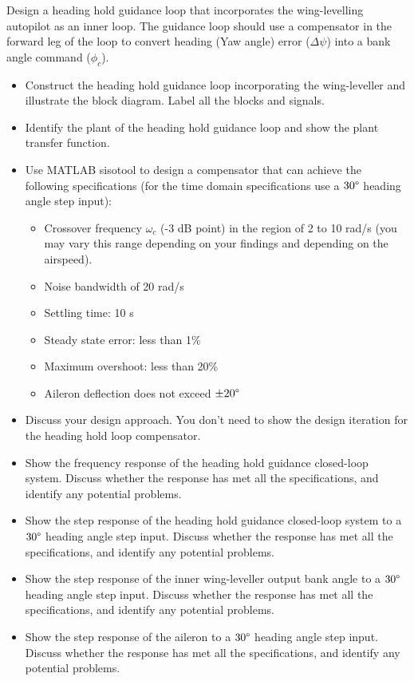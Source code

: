 Design a heading hold guidance loop that incorporates the wing-levelling autopilot as an inner loop. The guidance loop should use a compensator in the forward leg of the loop to convert heading (Yaw angle) error ($\Delta \psi$) into a bank angle command ($\phi_c$).
\begin{itemize}
\item Construct the heading hold guidance loop incorporating the wing-leveller and illustrate the block diagram. Label all the blocks and signals.
\item Identify the plant of the heading hold guidance loop and show the plant transfer function.
\item Use MATLAB sisotool to design a compensator that can achieve the following specifications (for the time domain specifications use a $30 \degree$ heading angle step input):
\begin{itemize}
\item Crossover frequency $\omega_c$ (-3 dB point) in the region of 2 to 10 rad/s (you may vary this range depending on your findings and depending on the airspeed).
\item Noise bandwidth of 20 rad/s
\item Settling time: 10 s
\item Steady state error: less than 1\%
\item Maximum overshoot: less than 20\%
\item Aileron deflection does not exceed $\pm 20 \degree$
\end{itemize}
\item Discuss your design approach. You don’t need to show the design iteration for the heading hold loop compensator.
\item Show the frequency response of the heading hold guidance closed-loop system. Discuss whether the response has met all the specifications, and identify any potential problems.
\item Show the step response of the heading hold guidance closed-loop system to a $30\degree$ heading angle step input. Discuss whether the response has met all the specifications, and identify any potential problems.
\item Show the step response of the inner wing-leveller output bank angle to a $30\degree$ heading angle step input. Discuss whether the response has met all the specifications, and identify any potential problems.
\item Show the step response of the aileron to a $30\degree$ heading angle step input. Discuss whether the response has met all the specifications, and identify any potential problems.
\end{itemize}
